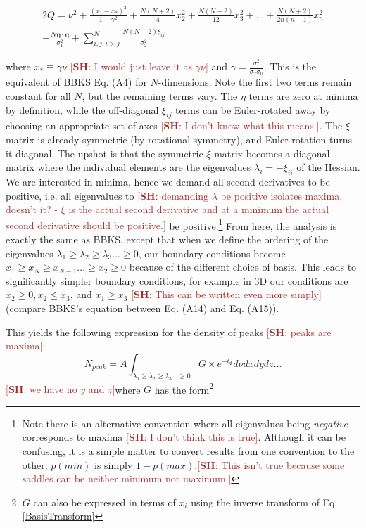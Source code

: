 \documentclass[12pt]{article}
\newcommand{\SH}[1]{\textcolor{brown}{[{\bf SH}: #1]}}
\begin{document}
\begin{equation} \label{Q}
\begin{split}
2Q = \nu^2 + \frac{(x_1-x_*)^2}{1-\gamma^2} + \frac{N(N+2)}{4}x_2^2 + \frac{N(N+2)}{12}x_3^2 + \ldots + \frac{N(N+2)}{2n(n-1)}x_n^2 \\ + \frac{N \pmb{\eta}\cdot \pmb{\eta}}{\sigma_1^2} + \sum_{i,j;i > j}^N\frac{N(N+2)\xi_{ij}}{\sigma_2^2}
\end{split}
\end{equation}

\noindent where $x_* \equiv \gamma \nu$ \SH{I would just leave it as $\gamma \nu$} and $\gamma = \frac{\sigma_1^2}{\sigma_2 \sigma_0}$. This is the equivalent of BBKS Eq. (A4) for $N$-dimensions. Note the first two terms remain constant for all $N$, but the remaining terms vary. The $\eta$ terms are zero at minima by definition, while the off-diagonal $\xi_{ij}$ terms can be Euler-rotated away by choosing an appropriate set of axes \SH{I don't know what this means.}. The $\xi$ matrix is already symmetric (by rotational symmetry), and Euler rotation turns it diagonal.\cite{Goldstein} The upshot is that the symmetric $\xi$ matrix becomes a diagonal matrix where the individual elements are the eigenvalues $\lambda_i = -\xi_{ii}$ of the Hessian. We are interested in minima, hence we demand all second derivatives to be positive, i.e. all eigenvalues to  \SH{demanding $\lambda$ be positive isolates maxima, doesn't it? - $\xi$ is the actual second derivative and at a minimum the actual second derivative should be positive.} be positive.\footnote{Note there is an alternative convention where all eigenvalues being \emph{negative} corresponds to maxima \SH{I don't think this is true}. Although it can be confusing, it is a simple matter to convert results from one convention to the other; $p(min)$ is simply $1-p(max)$.\SH{This isn't true because some saddles can be neither minimum nor maximum.}} From here, the analysis is exactly the same as BBKS, except that when we define the ordering of the eigenvalues $\lambda_1 \geq \lambda_2 \geq \lambda_3 \ldots \geq 0$, our boundary conditions become $x_1\geq x_N\geq x_{N-1} ... \geq x_2 \geq 0$ because of the different choice of basis. This leads to significantly simpler boundary conditions, for example in 3D our conditions are $x_2 \geq 0, x_2 \leq x_3$, and $x_1 \geq x_3$ \SH{This can be written even more simply} (compare BBKS's equation between Eq. (A14) and Eq. (A15)).

This yields the following expression for the density of peaks \SH{peaks are maxima}:
%
\begin{equation} \label{DensityOfPeaks}
N_{peak} = A \int_{\lambda_1 \geq \lambda_2 \geq \lambda_3 \ldots \geq 0} G \times e^{-Q} d\nu dx dy dz \ldots
\end{equation}
%
\SH{we have no $y$ and $z$}\noindent where $G$ has the form\footnote{$G$ can also be expressed in terms of $x_i$ using the inverse transform of Eq. \ref{BasisTransform}}
\end{document}
